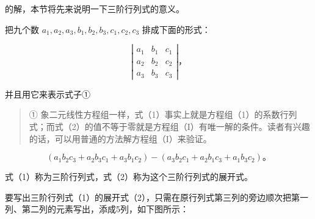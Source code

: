 的解，本节将先来说明一下三阶行列式的意义。

把九个数 \(a_1, a_2, a_3, b_1, b_2, b_3, c_1, c_2, c_3\)
排成下面的形式：

\[
\left| \begin{array}{ccc} a _ {1} & b _ {1} & c _ {1} \\ a _ {2} & b _ {2} & c _ {2} \\ a _ {3} & b _ {3} & c _ {3} \end{array} \right|\text{，} \tag {1}
\]

并且用它来表示式子①

\begin{quote}
①
象二元线性方程组一样，式（1）事实上就是方程组（1）的系数行列式；而式（2）的值不等于零就是方程组（I）有唯一解的条件。读者有兴趣的话，可以用普通的方法解方程组（I）来验证。
\end{quote}

\[
\left(a _ {1} b _ {2} c _ {3} + a _ {2} b _ {3} c _ {1} + a _ {3} b _ {1} c _ {2}\right) - \left(a _ {3} b _ {2} c _ {1} + a _ {2} b _ {1} c _ {3} + a _ {1} b _ {3} c _ {2}\right)\text{。} \tag {2}
\]

式（1）称为三阶行列式，式（2）称为这个三阶行列式的展开式。

要写出三阶行列式（1）的展开式（2），只需在原行列式第三列的旁边顺次把第一列、第二列的元素写出，添成5列，如下图所示：

